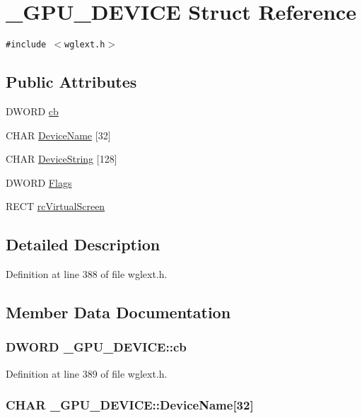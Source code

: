 \hypertarget{struct___g_p_u___d_e_v_i_c_e}{
\section{\_\-GPU\_\-DEVICE Struct Reference}
\label{struct___g_p_u___d_e_v_i_c_e}
}
{\tt \#include $<$wglext.h$>$}

\subsection*{Public Attributes}
\begin{CompactItemize}
\item 
DWORD \hyperlink{struct___g_p_u___d_e_v_i_c_e_fcb22f16ba9e526610489ff56ab78ddb}{cb}
\item 
CHAR \hyperlink{struct___g_p_u___d_e_v_i_c_e_604bfab61f1a2c5d1e635837d369ba14}{DeviceName} \mbox{[}32\mbox{]}
\item 
CHAR \hyperlink{struct___g_p_u___d_e_v_i_c_e_ff8b7920ccc85afcd6f325da6cdb0b73}{DeviceString} \mbox{[}128\mbox{]}
\item 
DWORD \hyperlink{struct___g_p_u___d_e_v_i_c_e_008db9d0f5fc13a5160805f40465f14a}{Flags}
\item 
RECT \hyperlink{struct___g_p_u___d_e_v_i_c_e_eb573bbeb3b6c589246720ef259b9a27}{rcVirtualScreen}
\end{CompactItemize}


\subsection{Detailed Description}


Definition at line 388 of file wglext.h.

\subsection{Member Data Documentation}
\hypertarget{struct___g_p_u___d_e_v_i_c_e_fcb22f16ba9e526610489ff56ab78ddb}{
\subsubsection[{cb}]{\setlength{\rightskip}{0pt plus 5cm}DWORD {\bf \_\-GPU\_\-DEVICE::cb}}}
\label{struct___g_p_u___d_e_v_i_c_e_fcb22f16ba9e526610489ff56ab78ddb}




Definition at line 389 of file wglext.h.\hypertarget{struct___g_p_u___d_e_v_i_c_e_604bfab61f1a2c5d1e635837d369ba14}{
\subsubsection[{DeviceName}]{\setlength{\rightskip}{0pt plus 5cm}CHAR {\bf \_\-GPU\_\-DEVICE::DeviceName}\mbox{[}32\mbox{]}}}
\label{struct___g_p_u___d_e_v_i_c_e_604bfab61f1a2c5d1e635837d369ba14}




